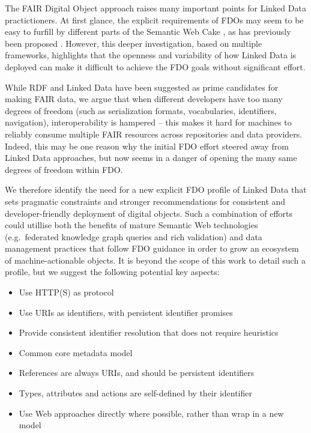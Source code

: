 \documentclass[fleqn,10pt,lineno]{wlpeerjlua}
\providecommand{\tightlist}{%
  \setlength{\itemsep}{0pt}\setlength{\parskip}{0pt}}
\begin{document}
The FAIR Digital Object approach raises many important points for Linked Data practictioners.
At first glance, the explicit requirements of FDOs may seem to be easy to furfill by different parts of the Semantic Web Cake \autocite[][slide 10]{SemanticWebXML2000}, as  has previously been proposed \autocite{10.3897/rio.8.e94501}.
However, this deeper investigation, based on multiple frameworks, highlights that the openness and variability of how Linked Data is deployed can make it difficult to achieve the FDO goals without significant effort.

While RDF and Linked Data have been suggested as prime candidates for making FAIR data, we argue that when different developers have too many degrees of freedom (such as serialization formats, vocabularies, identifiers, navigation), interoperability is hampered -- this makes it hard for machines to reliably consume multiple FAIR resources across repositories and data providers. 
Indeed, this may be one reason why the initial FDO effort steered away from Linked Data approaches, but now seems in a danger of opening the many same degrees of freedom within FDO.

We therefore identify the need for a new explicit FDO profile of Linked Data that sets pragmatic constraints and stronger recommendations for consistent and developer-friendly deployment of digital objects. 
Such a combination of efforts could utillise both the benefits of mature Semantic Web technologies (e.g.~federated knowledge graph queries and rich validation) and data management practices that follow FDO guidance in order to grow an ecosystem of machine-actionable objects. 
It is beyond the scope of this work to detail such a profile, but we suggest the following potential key aspects:

\begin{itemize}
  \tightlist
  \item Use HTTP(S) as protocol
  \item Use URIs as identifiers, with persistent identifier promises
  \item Provide consistent identifier resolution that does not require heuristics
  \item Common core metadata model
  \item References are always URIs, and should be persistent identifiers
  \item Types, attributes and actions are self-defined by their identifier
  \item Use Web approaches directly where possible, rather than wrap in a new model
\end{itemize}
\end{document}
